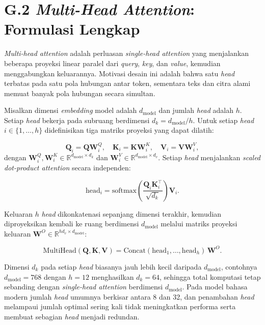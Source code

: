\section*{G.2 \textit{Multi-Head Attention}: Formulasi Lengkap}
\label{app:mha-detail}

\textit{Multi-head attention} adalah perluasan \textit{single-head attention} yang menjalankan beberapa proyeksi linear paralel dari \textit{query}, \textit{key}, dan \textit{value}, kemudian menggabungkan keluarannya. Motivasi desain ini adalah bahwa satu \textit{head} terbatas pada satu pola hubungan antar token, sementara teks dan citra alami memuat banyak pola hubungan secara simultan.

Misalkan dimensi \textit{embedding} model adalah $d_{\text{model}}$ dan jumlah \textit{head} adalah $h$. Setiap \textit{head} bekerja pada subruang berdimensi $d_k = d_{\text{model}} / h$. Untuk setiap \textit{head} $i \in \{1, \dots, h\}$ didefinisikan tiga matriks proyeksi yang dapat dilatih:

\begin{equation}
    \mathbf{Q}_i = \mathbf{Q} \mathbf{W}_i^Q, \quad
    \mathbf{K}_i = \mathbf{K} \mathbf{W}_i^K, \quad
    \mathbf{V}_i = \mathbf{V} \mathbf{W}_i^V,
    \label{eq:mha_proj}
\end{equation}
dengan $\mathbf{W}_i^Q, \mathbf{W}_i^K \in \mathbb{R}^{d_{\text{model}} \times d_k}$ dan $\mathbf{W}_i^V \in \mathbb{R}^{d_{\text{model}} \times d_v}$. Setiap \textit{head} menjalankan \textit{scaled dot-product attention} secara independen:

\begin{equation}
    \text{head}_i = \text{softmax}\!\left( \frac{\mathbf{Q}_i \mathbf{K}_i^\top}{\sqrt{d_k}} \right) \mathbf{V}_i.
    \label{eq:mha_head}
\end{equation}

Keluaran $h$ \textit{head} dikonkatenasi sepanjang dimensi terakhir, kemudian diproyeksikan kembali ke ruang berdimensi $d_{\text{model}}$ melalui matriks proyeksi keluaran $\mathbf{W}^O \in \mathbb{R}^{h d_v \times d_{\text{model}}}$:

\begin{equation}
    \text{MultiHead}(\mathbf{Q}, \mathbf{K}, \mathbf{V}) = \text{Concat}(\text{head}_1, \dots, \text{head}_h) \, \mathbf{W}^O.
    \label{eq:multihead}
\end{equation}

Dimensi $d_k$ pada setiap \textit{head} biasanya jauh lebih kecil daripada $d_{\text{model}}$, contohnya $d_{\text{model}} = 768$ dengan $h = 12$ menghasilkan $d_k = 64$, sehingga total komputasi tetap sebanding dengan \textit{single-head attention} berdimensi $d_{\text{model}}$. Pada model bahasa modern jumlah \textit{head} umumnya berkisar antara 8 dan 32, dan penambahan \textit{head} melampaui jumlah optimal sering kali tidak meningkatkan performa serta membuat sebagian \textit{head} menjadi redundan.

